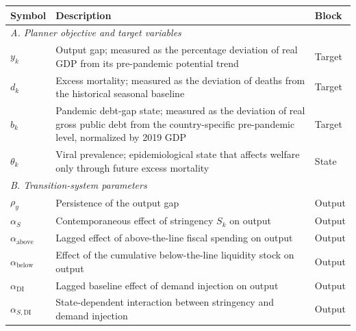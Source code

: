 \documentclass[12pt, a4paper]{article}
\begin{document}
\begin{table}[H]
  \centering
  \scriptsize
  \renewcommand{\arraystretch}{1.15}
  \begin{tabular}{lp{9.5cm}l}
  \toprule
  \textbf{Symbol} & \textbf{Description} & \textbf{Block} \\
  \midrule

  \multicolumn{3}{l}{\textit{A. Planner objective and target variables}} \\
\midrule

$y_k$ 
& Output gap; measured as the percentage deviation of real GDP from its pre-pandemic potential trend 
& Target \\

$d_k$ 
& Excess mortality; measured as the deviation of deaths from the historical seasonal baseline 
& Target \\

$b_k$ 
& Pandemic debt-gap state; measured as the deviation of real gross public debt from the country-specific pre-pandemic level, normalized by 2019 GDP
& Target \\

$\theta_k$ 
& Viral prevalence; epidemiological state that affects welfare only through future excess mortality 
& State \\

  \midrule
  \multicolumn{3}{l}{\textit{B. Transition-system parameters}} \\
  \midrule

  $\rho_y$                 
  & Persistence of the output gap                                          
  & Output \\

  $\alpha_S$               
  & Contemporaneous effect of stringency $S_k$ on output                          
  & Output \\

  $\alpha_{\text{above}}$  
  & Lagged effect of above-the-line fiscal spending on output                    
  & Output \\

  $\alpha_{\text{below}}$  
  & Effect of the cumulative below-the-line liquidity stock on output  
  & Output \\

  $\alpha_{\text{DI}}$     
  & Lagged baseline effect of demand injection on output                              
  & Output \\

  $\alpha_{S,\text{DI}}$   
  & State-dependent interaction between stringency and demand injection         
  & Output \\


\end{tabular}
\end{table}
\end{document}
